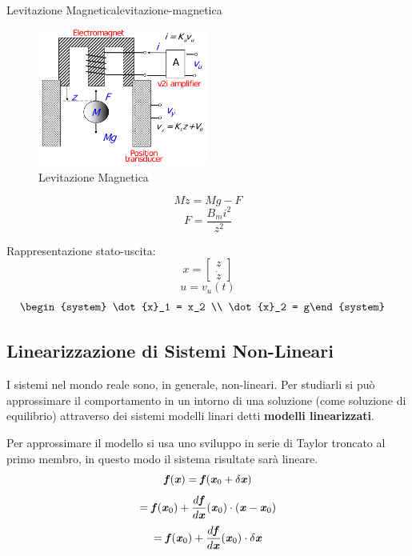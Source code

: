 \documentclass[12pt]{article}
\begin{document}
\begin{example}{Levitazione Magnetica}{levitazione-magnetica}
    \begin{figure}[H]
        \centering
        \includegraphics[width=0.5\textwidth]{levitazione-magnetica.png}
        \caption{Levitazione Magnetica}
        \label{fig:levitazione-magnetica}
    \end{figure}

    \[ M\ddot{z} = Mg - F \]
    \[ F = \frac{B_m i^{2}}{z^{2}}  \]

    Rappresentazione stato-uscita:
    \[ x = \begin{bmatrix} z \\ \dot{z} \end{bmatrix}  \]
    \[ u = v_u(t) \]
    \begin{align*}
        & \begin{system} \dot{x}_1 = x_2 \\
        \dot{x}_2 = g\end{system} 
    \end{align*}

\end{example}

\subsection{Linearizzazione di Sistemi Non-Lineari}
I sistemi nel mondo reale sono, in generale, non-lineari. Per studiarli si pu\`o approssimare il comportamento in un intorno di una soluzione (come soluzione di equilibrio) attraverso dei sistemi modelli linari detti \textbf{modelli linearizzati}.

Per approssimare il modello si usa uno sviluppo in serie di Taylor troncato al primo membro, in questo modo il sistema risultate sar\`a lineare.
\[ \textbf{\textit{f}}(\textbf{\textit{x}}) = \textbf{\textit{f}}( \textbf{\textit{x}}_0 + \delta\textbf{\textit{x}}) \]
\[ = \textbf{\textit{f}}(\textbf{\textit{x}}_0) + \frac{d \textbf{\textit{f}}}{d \textbf{\textit{x}}}(\textbf{\textit{x}}_0) \cdot (\textbf{\textit{x}} - \textbf{\textit{x}}_0) \]
\[  = \textbf{\textit{f}}(\textbf{\textit{x}}_0) + \frac{d \textbf{\textit{f}}}{d \textbf{\textit{x}}}(\textbf{\textit{x}}_0) \cdot \delta\textbf{\textit{x}}  \]
\end{document}
